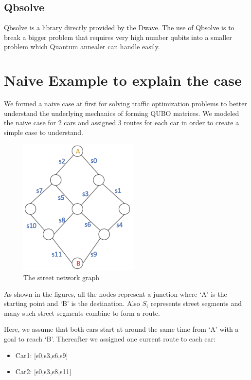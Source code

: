 \documentclass[conference]{IEEEtran}
\begin{document}
\subsection{Qbsolve}

Qbsolve is a library directly provided by the Dwave. The use of Qbsolve is to break a bigger problem that requires very high number qubits into a smaller problem which Quantum annealer can handle easily.


\section{Naive Example to explain the case}

We formed a naive case at first for solving traffic optimization problems to better understand the underlying mechanics of forming QUBO matrices. We modeled the naive case for 2 cars and assigned 3 routes for each car in order to create a simple case to understand.\vspace{6pt}

\begin{figure}[ht]
\centerline{\includegraphics[width=6cm]{graph.png}}
\caption{The street network graph}
\label{fig}
\end{figure}

As shown in the figures, all the nodes represent a junction where ‘A’ is the starting point and ‘B’ is the destination. Also \( \textit{S} _{i} \) represents street segments and many such street segments combine to form a route.\vspace{6pt}

Here, we assume that both cars start at around the same time from ‘A’ with a goal to reach ‘B’. Thereafter we assigned one current route to each car:\vspace{6pt}

\begin{itemize}
    \item Car1: [s0,s3,s6,s9]
    \item Car2: [s0,s3,s8,s11]
\end{itemize}
\vspace{6pt}
\end{document}
